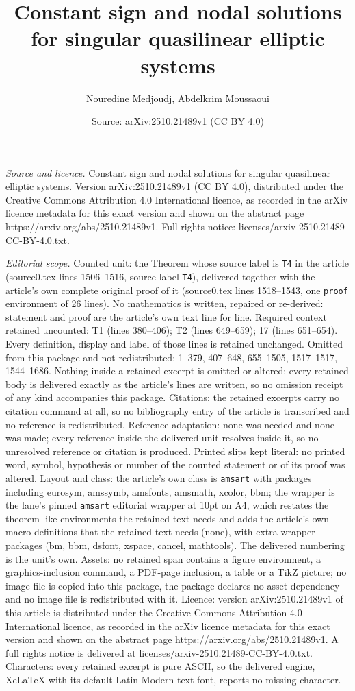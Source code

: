 \documentclass[10pt,a4paper]{amsart}
\title[Constant sign and nodal solutions for singular quasilinear e]{Constant sign and nodal solutions for singular quasilinear elliptic systems}
\author{Nouredine Medjoudj, Abdelkrim Moussaoui}
\date{Source: arXiv:2510.21489v1 (CC BY 4.0)}
\begin{document}
\maketitle

\noindent\emph{Source and licence.} Constant sign and nodal solutions for singular quasilinear elliptic systems. Version arXiv:2510.21489v1 (CC BY 4.0), distributed under the Creative Commons Attribution 4.0 International licence, as recorded in the arXiv licence metadata for this exact version and shown on the abstract page https://arxiv.org/abs/2510.21489v1. Full rights notice: licenses/arxiv-2510.21489-CC-BY-4.0.txt.\par\smallskip

\noindent\textit{Editorial scope.} Counted unit: the Theorem whose source label is \texttt{T4} in the article (source0.tex lines 1506--1516, source label \texttt{T4}), delivered together with the article's own complete original proof of it (source0.tex lines 1518--1543, one \texttt{proof} environment of 26 lines). No mathematics is written, repaired or re-derived: statement and proof are the article's own text line for line. Required context retained uncounted: T1 (lines 380--406); T2 (lines 649--659); 17 (lines 651--654). Every definition, display and label of those lines is retained unchanged. Omitted from this package and not redistributed: 1--379, 407--648, 655--1505, 1517--1517, 1544--1686. Nothing inside a retained excerpt is omitted or altered: every retained body is delivered exactly as the article's lines are written, so no omission receipt of any kind accompanies this package. Citations: the retained excerpts carry no citation command at all, so no bibliography entry of the article is transcribed and no reference is redistributed. Reference adaptation: none was needed and none was made; every reference inside the delivered unit resolves inside it, so no unresolved reference or citation is produced. Printed slips kept literal: no printed word, symbol, hypothesis or number of the counted statement or of its proof was altered. Layout and class: the article's own class is \texttt{amsart} with packages including eurosym, amssymb, amsfonts, amsmath, xcolor, bbm; the wrapper is the lane's pinned \texttt{amsart} editorial wrapper at 10pt on A4, which restates the theorem-like environments the retained text needs and adds the article's own macro definitions that the retained text needs (none), with extra wrapper packages (bm, bbm, dsfont, xspace, cancel, mathtools). The delivered numbering is the unit's own. Assets: no retained span contains a figure environment, a graphics-inclusion command, a PDF-page inclusion, a table or a TikZ picture; no image file is copied into this package, the package declares no asset dependency and no image file is redistributed with it. Licence: version arXiv:2510.21489v1 of this article is distributed under the Creative Commons Attribution 4.0 International licence, as recorded in the arXiv licence metadata for this exact version and shown on the abstract page https://arxiv.org/abs/2510.21489v1. A full rights notice is delivered at licenses/arxiv-2510.21489-CC-BY-4.0.txt. Characters: every retained excerpt is pure ASCII, so the delivered engine, XeLaTeX with its default Latin Modern text font, reports no missing character.
\end{document}
